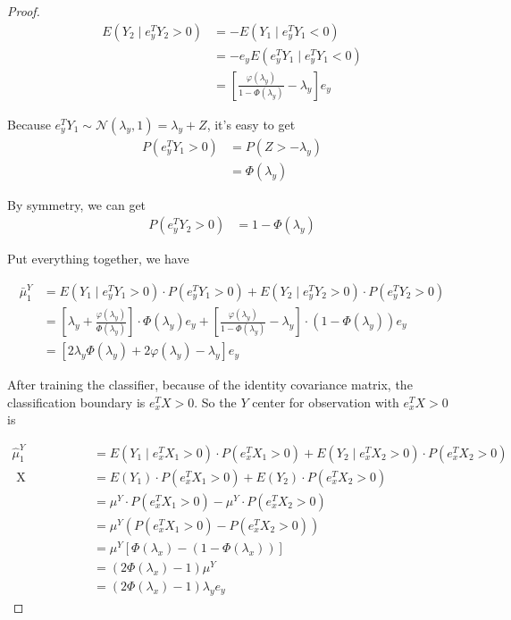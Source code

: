 \documentclass[12pt]{article}
\begin{document}
\begin{proof}
\begin{align}
E(Y_2 \mid e^T_y Y_2 > 0)  &= - E(Y_1 \mid e^T_y Y_1 < 0) \\
	&= - e_y E( e^T_y Y_1 \mid e^T_y Y_1 < 0  )  \\
	&= \left[ \frac{\varphi(\lambda_y)}{1-\Phi(\lambda_y)} - \lambda_y  \right] e_y 
\end{align}

Because $e^T_y Y_1 \sim \mathcal{N}\left( \lambda_y, 1\right)  = \lambda_y + Z$, it's easy to get 
\begin{align}
P(e^T_y Y_1 > 0) &= P(Z > - \lambda_y) \\
	&= \Phi(\lambda_y) 
\end{align}

By symmetry, we can get 
\begin{align}
P(e^T_y Y_2 > 0) &= 1- \Phi(\lambda_y)
\end{align}

Put everything together, we have 

\begin{align}
\bar{\mu}^Y_1 & = E(Y_1 \mid e^T_y Y_1 > 0) \cdot P(e^T_y Y_1 >0) +E(Y_2 \mid e^T_y Y_2 > 0) \cdot P(e^T_y Y_2 >0) \\
 &=  \left[ \lambda_y + \frac{\varphi(\lambda_y)}{\Phi(\lambda_y)}  \right]\cdot \Phi(\lambda_y) e_y + \left[ \frac{\varphi(\lambda_y)}{1-\Phi(\lambda_y)} - \lambda_y  \right]\cdot\left(1- \Phi(\lambda_y)\right) e_y  \\
 & = [2\lambda_y \Phi(\lambda_y) + 2\varphi(\lambda_y) - \lambda_y]e_y 
\end{align}

After training the classifier, because of the identity covariance matrix, the classification boundary is $e^T_x X > 0$. So the $Y$ center for observation with $e^T_x X > 0$ is 

\begin{align}
\hat{\mu}^Y_1 &= E(Y_1 \mid e^T_x X_1 > 0)\cdot P(e^T_x X_1 > 0) + E(Y_2 \mid e^T_x X_2 > 0)\cdot P(e^T_x X_2 > 0)\\ 
\text{ X independent of Y}	&= E(Y_1) \cdot P(e^T_x X_1 > 0) + E(Y_2) \cdot P(e^T_x X_2 > 0)\\ 
  & = \mu^Y \cdot P(e^T_x X_1 > 0) -  \mu^Y \cdot P(e^T_x X_2 > 0)\\
  & = \mu^Y \left( P(e^T_x X_1 > 0) -  P(e^T_x X_2 > 0)  \right) \\
   & = \mu^Y \left[ \Phi(\lambda_x) -  (1-\Phi(\lambda_x))  \right] \\
   & = (2\Phi(\lambda_x) - 1)\mu^Y \\
    & = (2\Phi(\lambda_x) - 1)\lambda_y e_y
\end{align}


\end{proof}
\end{document}
